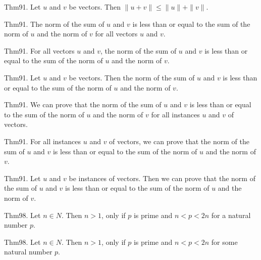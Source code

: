 \documentclass{article}
\begin{document}
Thm91. Let $u$ and $v$ be vectors. Then $\| u + v \| \leq \| u \| + \| v \|$.

Thm91. The norm of the sum of $u$ and $v$ is less than or equal to the sum of the norm of $u$ and the norm of $v$ for all vectors $u$ and $v$.

Thm91. For all vectors $u$ and $v$, the norm of the sum of $u$ and $v$ is less than or equal to the sum of the norm of $u$ and the norm of $v$.

Thm91. Let $u$ and $v$ be vectors. Then the norm of the sum of $u$ and $v$ is less than or equal to the sum of the norm of $u$ and the norm of $v$.

Thm91. We can prove that the norm of the sum of $u$ and $v$ is less than or equal to the sum of the norm of $u$ and the norm of $v$ for all instances $u$ and $v$ of vectors.

Thm91. For all instances $u$ and $v$ of vectors, we can prove that the norm of the sum of $u$ and $v$ is less than or equal to the sum of the norm of $u$ and the norm of $v$.

Thm91. Let $u$ and $v$ be instances of vectors. Then we can prove that the norm of the sum of $u$ and $v$ is less than or equal to the sum of the norm of $u$ and the norm of $v$.

Thm98. Let $n \in N$. Then $n > 1$, only if $p$ is prime and $n < p < 2 n$ for a natural number $p$.

Thm98. Let $n \in N$. Then $n > 1$, only if $p$ is prime and $n < p < 2 n$ for some natural number $p$.
\end{document}
